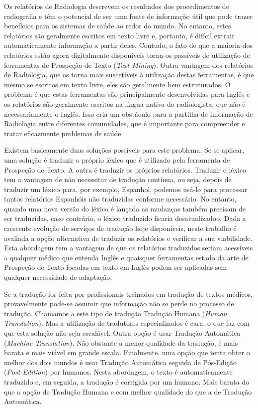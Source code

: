 \begin{abstractspt}
	
Os relatórios de Radiologia descrevem os resultados dos procedimentos de radiografia e têm o potencial de ser uma fonte de informação útil que pode trazer benefícios para os sistemas de saúde ao redor do mundo. No entanto, estes relatórios são geralmente escritos em texto livre e, portanto, é difícil extrair automaticamente informação a partir deles. Contudo, o fato de que a maioria dos relatórios estão agora digitalmente disponíveis torna-os passíveis de utilização de ferramentas de Prospeção de Texto (\textit{Text Mining}). Outra vantagem dos relatórios de Radiologia, que os torna mais suscetíveis à utilização destas ferramentas, é que mesmo se escritos em texto livre, eles são geralmente bem estruturados. O problema é que estas ferramentas são principalmente desenvolvidas para Inglês e os relatórios são geralmente escritos na língua nativa do radiologista, que não é necessariamente o Inglês. Isso cria um obstáculo para a partilha de informação de Radiologia entre diferentes comunidades, que é importante para compreender e tratar eficazmente problemas de saúde.

Existem basicamente duas soluções possíveis para este problema. Se se aplicar, uma solução é traduzir o próprio léxico que é utilizado pela ferramenta de Prospeção de Texto. A outra é traduzir os próprios relatórios. Traduzir o léxico tem a vantagem de não necessitar de tradução contínua, ou seja, depois de traduzir um léxico para, por exemplo, Espanhol, podemos usá-lo para processar tantos relatórios Espanhóis não traduzidas conforme necessário. No entanto, quando uma nova versão do léxico é lançada as mudanças também precisam de ser traduzidas, caso contrário, o léxico traduzido ficaria desatualizadoo. Dada a crescente evolução de serviços de tradução hoje disponíveis, neste trabalho é avaliada a opção alternativa de traduzir os relatórios e verificar a sua viabilidade. Esta abordagem tem a vantagem de que os relatórios traduzidos seriam acessíveis a qualquer médico que entenda Inglês e quaisquer ferramentas estado da arte de Prospeção de Texto focadas em texto em Inglês podem ser aplicadas sem qualquer necessidade de adaptação.

Se a tradução for feita por profissionais treinados em tradução de textos médicos, provavelmente pode-se assumir que informação não se perde no processo de tradução. Chamamos a este tipo de tradução Tradução Humana (\textit{Human Translation}). Mas a utilização de tradutores especializados é cara, o que faz com que esta solução não seja escalável. Outra opção é usar Tradução Automática (\textit{Machine Translation}). Não obstante a menor qualidade da tradução, é mais barata e mais viável em grande escala. Finalmente, uma opção que tenta obter o melhor dos dois mundos é usar Tradução Automática seguida de Pós-Edição (\textit{Post-Edition}) por humanos. Nesta abordagem, o texto é automaticamente traduzido e, em seguida, a tradução é corrigida por um humano. Mais barata do que a opção de Tradução Humana e com melhor qualidade do que a de Tradução Automática.


\end{abstractspt}
